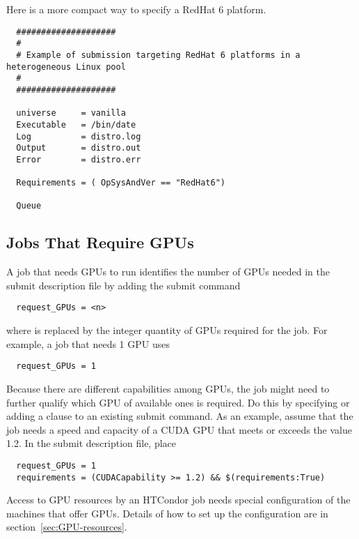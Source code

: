 Here is a more compact way to specify a RedHat 6 platform.

\begin{verbatim}
  ####################
  #
  # Example of submission targeting RedHat 6 platforms in a heterogeneous Linux pool
  #
  ####################

  universe     = vanilla
  Executable   = /bin/date
  Log          = distro.log
  Output       = distro.out
  Error        = distro.err

  Requirements = ( OpSysAndVer == "RedHat6")

  Queue
\end{verbatim}

\subsection{\label{sec:Request-GPUs}Jobs That Require GPUs}
A job that needs GPUs to run identifies the number of GPUs needed
in the submit description file by adding the submit command
\begin{verbatim}
  request_GPUs = <n>
\end{verbatim}
where  is replaced by the integer quantity of GPUs required
for the job.
For example, a job that needs 1 GPU uses
\begin{verbatim}
  request_GPUs = 1
\end{verbatim}

Because there are different capabilities among GPUs, 
the job might need to further qualify which GPU of available ones
is required.
Do this by specifying or adding a clause to an existing 
 submit command.
As an example, 
assume that the job needs a speed and capacity of a CUDA GPU
that meets or exceeds the value 1.2.
In the submit description file, place
\begin{verbatim}
  request_GPUs = 1
  requirements = (CUDACapability >= 1.2) && $(requirements:True)
\end{verbatim}

Access to GPU resources by an HTCondor job needs special configuration
of the machines that offer GPUs.
Details of how to set up the configuration are in
section~\ref{sec:GPU-resources}.




